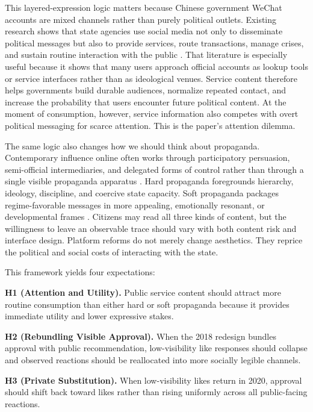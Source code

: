 \documentclass[12pt, american]{article}
\begin{document}
\begin{refsection}
This layered-expression logic matters because Chinese government WeChat accounts are mixed channels rather than purely political outlets. Existing research shows that state agencies use social media not only to disseminate political messages but also to provide services, route transactions, manage crises, and sustain routine interaction with the public \parencite{JiangEtAl2021,LiuMaXia2024,YuShen2026,Zheng2013,ZhengZheng2014}. That literature is especially useful because it shows that many users approach official accounts as lookup tools or service interfaces rather than as ideological venues. Service content therefore helps governments build durable audiences, normalize repeated contact, and increase the probability that users encounter future political content. At the moment of consumption, however, service information also competes with overt political messaging for scarce attention. This is the paper's attention dilemma.

The same logic also changes how we should think about propaganda. Contemporary influence online often works through participatory persuasion, semi-official intermediaries, and delegated forms of control rather than through a single visible propaganda apparatus \parencite{KingPanRoberts2017,LuPan2021,Neagli2021,RepnikovaFang2018,SunZhao2022}. Hard propaganda foregrounds hierarchy, ideology, discipline, and coercive state capacity. Soft propaganda packages regime-favorable messages in more appealing, emotionally resonant, or developmental frames \parencite{MattinglyYao2022,PanShaoXu2022,Wang2024Propaganda}. Citizens may read all three kinds of content, but the willingness to leave an observable trace should vary with both content risk and interface design. Platform reforms do not merely change aesthetics. They reprice the political and social costs of interacting with the state.

This framework yields four expectations:

\noindent \textbf{H1 (Attention and Utility).} Public service content should attract more routine consumption than either hard or soft propaganda because it provides immediate utility and lower expressive stakes.

\noindent \textbf{H2 (Rebundling Visible Approval).} When the 2018 redesign bundles approval with public recommendation, low-visibility like responses should collapse and observed reactions should be reallocated into more socially legible channels.

\noindent \textbf{H3 (Private Substitution).} When low-visibility likes return in 2020, approval should shift back toward likes rather than rising uniformly across all public-facing reactions.


\end{refsection}
\end{document}

